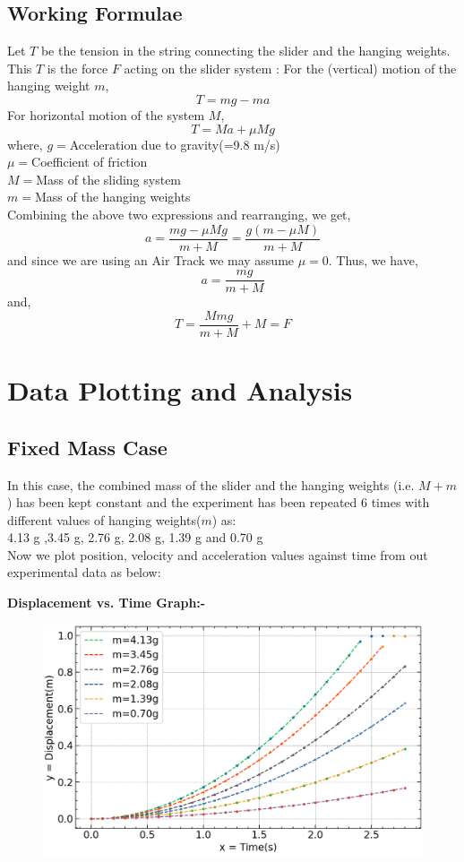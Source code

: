 \documentclass{article}
\begin{document}
	\subsection{Working Formulae}
	Let $T$ be the tension in the string connecting the slider and the hanging 
	weights. This $T$ is the force $F$ acting on the slider system :
	For the (vertical) motion of the hanging weight $m$, $$T = mg - ma$$
	For horizontal motion of the system $M$,
	$$T = Ma + \mu Mg$$
	where, $g=$Acceleration due to gravity(=9.8 m/s)\\
	$\mu =$Coefficient of friction\\
	$M=$Mass of the sliding system\\ 
	$m=$Mass of the hanging weights\\[7pt]
	Combining the above two expressions and rearranging, we get,
	$$a = \frac{mg-\mu Mg}{m+M} = \frac{g(m-\mu M)}{m+M}$$
	and since we are using an Air Track we may assume $\mu = 0$. Thus, we have,
	$$a = \frac{mg}{m+M}$$
	and,
	$$T = \frac{Mmg}{m+M}+ M = F$$
	
	\section{Data Plotting and Analysis}
		\subsection{Fixed Mass Case} In this case, the combined 
		mass of the slider and the hanging weights (i.e. 
		$M+m$) has been kept constant and the experiment 
		has been repeated $6$ times with different values of 
		hanging weights($m$) as:\\
		4.13 g ,3.45 g, 2.76 g, 2.08 g, 1.39 g and 0.70 g \\
		Now we plot position, velocity and acceleration values against time from out 
		experimental data as below:
		
		\textbf{Displacement vs. Time Graph:-}
		
		\begin{figure}[H]
			\centering
			\includegraphics[scale=0.7]{displacement vs. time (fitted)}
			\caption{}
			\label{figure:disptime}%
		\end{figure}
	
\end{document}
